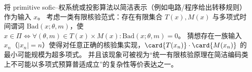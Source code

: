 \begin{conjecture}[简洁表示下有限核验集的超多项式不可避免性]\label{conj:spg-succinct-finite-audit-superpoly-unavoidable}
将 primitive sofic--权系统或投影算法以简洁表示（例如电路/程序给出转移规则）作为输入 \(x\)。
考虑一类有限核验范式：存在有限集合 \(T(x),M(x)\) 与多项式时间谓词 \(\mathrm{Bad}(x;\theta,m)\)，使
\(
x\in\Pi\iff \forall(\theta,m)\in T(x)\times M(x):\mathrm{Bad}(x;\theta,m)=0
\)。
猜想存在一族输入 \(x_n\)（\(|x_n|=n\)）使得对任意正确的核验集实现，\(\card{T(x_n)}\cdot\card{M(x_n)}\) 的最小可能规模为超多项式。
并且该现象可被视为“统一有限核验原理在简洁编码类上不可能以多项式预算普适成立”的复杂性等价表达之一。
\end{conjecture}

\endinput

